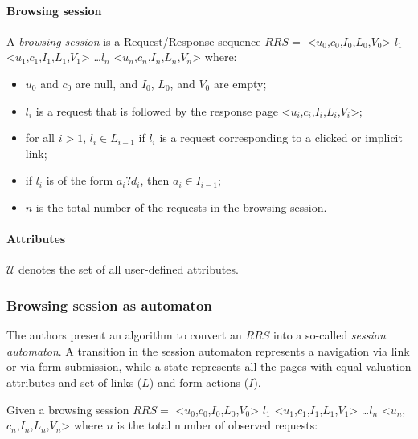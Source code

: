\documentclass[a4paper,10pt]{article}
\newcommand{\req}[1]{<$u_{#1}$,$c_{#1}$,$I_{#1}$,$L_{#1}$,$V_{#1}$>}
\begin{document}
\paragraph{Browsing session}
A \emph{browsing session} is a Request/Response sequence $RRS =$ \req{0} $l_1$ \req{1} \dots $l_n$ \req{n} where:

\begin{itemize}
  \item $u_0$ and $c_0$ are null, and $I_0$, $L_0$, and $V_0$ are empty;
  \item $l_i$ is a request that is followed by the response page <$u_i$,$c_i$,$I_i$,$L_i$,$V_i$>;
  \item for all $i > 1$, $l_i \in L_{i-1}$ if $l_i$ is a request corresponding to a clicked or implicit link;
  \item if $l_i$ is of the form $a_i?d_i$, then $a_i \in I_{i-1}$;
  \item $n$ is the total number of the requests in the browsing session.
\end{itemize}

\paragraph{Attributes}
$\mathcal{U}$ denotes the set of all user-defined attributes.

\subsubsection{Browsing session as automaton}

The authors present an algorithm to convert an $RRS$ into a so-called \emph{session automaton}. A transition in the session automaton represents a navigation via link or via form submission, while a state represents all the pages with equal valuation attributes and set of links ($L$) and form actions ($I$).

Given a browsing session $RRS =$ \req{0} $l_1$ \req{1} \dots $l_n$ \req{n} where $n$ is the total number of observed requests:
\end{document}
